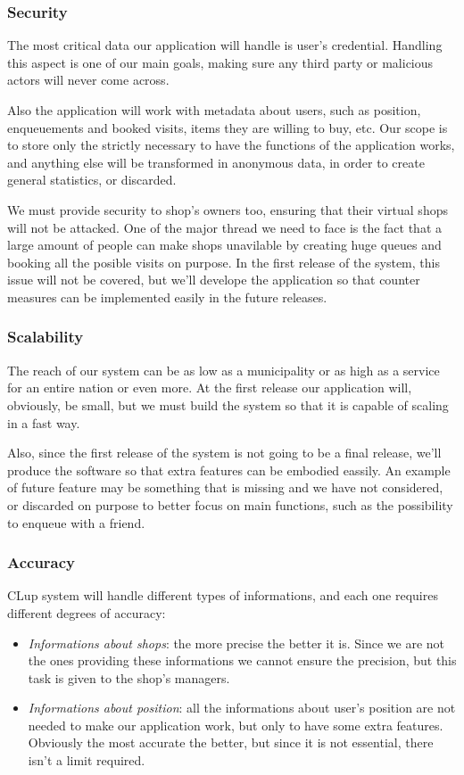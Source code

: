 \subsubsection{Security}
\label{subsubsect:security}

The most critical data our application will handle is user's credential. Handling this aspect is one of our main goals, making sure any third party or malicious actors will never come across. 

Also the application will work with metadata about users, such as position, enqueuements and booked visits, items they are willing to buy, etc. Our scope is to store only the strictly necessary to have the functions of the application works, and anything else will be transformed in anonymous data, in order to create general statistics, or discarded.

We must provide security to shop's owners too, ensuring that their virtual shops will not be attacked. One of the major thread we need to face is the fact that a large amount of people can make shops unavilable by creating huge queues and booking all the posible visits on purpose. In the first release of the system, this issue will not be covered, but we'll develope the application so that counter measures can be implemented easily in the future releases.

\subsubsection{Scalability}
\label{subsubsect:scalability}

The reach of our system can be as low as a municipality or as high as a service for an entire nation or even more. At the first release our application will, obviously, be small, but we must build the system so that it is capable of scaling in a fast way.

Also, since the first release of the system is not going to be a final release, we'll produce the software so that extra features can be embodied eassily. An example of future feature may be something that is missing and we have not considered, or discarded on purpose to better focus on main functions, such as the possibility to enqueue with a friend.

\subsubsection{Accuracy}
\label{subsubsect:accuracy}

CLup system will handle different types of informations, and each one requires different degrees of accuracy:
\begin{itemize}[topsep=0pt]
    \item \textit{Informations about shops}: the more precise the better it is. Since we are not the ones providing these informations we cannot ensure the precision, but this task is given to the shop's managers.
    \item \textit{Informations about position}: all the informations about user's position are not needed to make our application work, but only to have some extra features. Obviously the most accurate the better, but since it is not essential, there isn't a limit required.
\end{itemize}